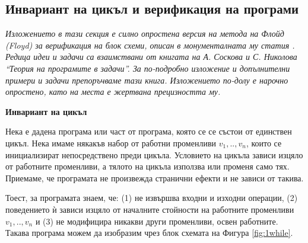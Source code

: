 {\begin{itemize}[resume]
\end{itemize}

\subsection{Инвариант на цикъл и верификация на програми}

\emph{Изложението в тази секция е силно опростена версия на метода на Флойд (Floyd) за верификация на блок схеми, описан в монументалната му статия \cite{floyd}. Редица идеи и задачи са взаимствани от книгата \cite{tpsbornik} на А. Соскова и С. Николова ``Теория на програмите в задачи''. За по-подробно изложение и допълнителни примери и задачи препоръчваме тази книга. Изложението по-долу е нарочно опростено, като на места е жертвана прецизността му.}

\begin{mdframed}[hidealllines=true,backgroundcolor=gray!20]


\bigskip
\textbf{Инвариант на цикъл}
\bigskip


Нека е дадена програма или част от програма, която се се състои от единствен  цикъл. Нека имаме някакъв набор от работни променливи $v_1,..,v_n$, които се инициализират непосредствено преди  цикъла. Условието на цикъла зависи изцяло от работните променливи, а тялото на цикъла използва или променя само тях. Приемаме, че програмата не произвежда странични ефекти и не зависи от такива.

Тоест, за програмата знаем, че: (1) не извършва входни и изходни операции, (2) поведението ѝ зависи изцяло от началните стойности на работните променливи $v_1,..,v_n$ и (3) не модифицира никакви други променливи, освен работните. Такава програма можем да изобразим чрез блок схемата на Фигура \ref{fig:1while}.
\end{mdframed}


\begin{figure}
\end{figure}}

